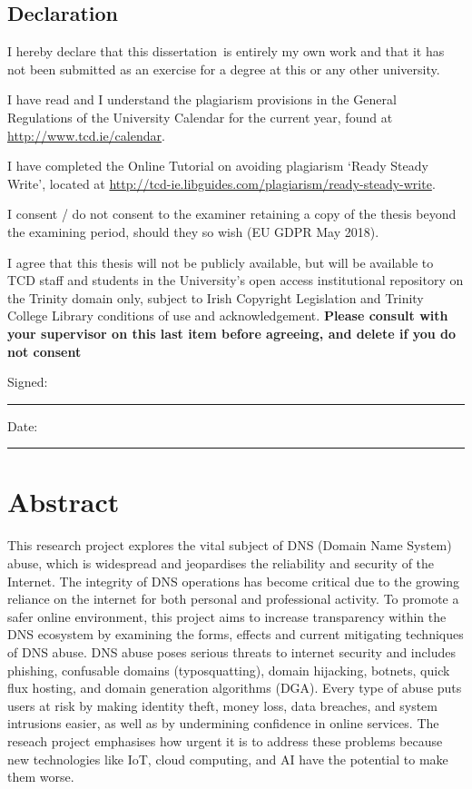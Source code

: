 \documentclass[a4paper,oneside,12pt]{book}
\title{\thesistitle}
\author{\authorname}
\newcommand{\typeofthesis}{dissertation} %
\numberwithin{equation}{chapter} %
\begin{document}

\section*{\Huge\textcolor{tcd_blue}{Declaration}}
\vspace{1cm}
I hereby declare that this \typeofthesis\ is entirely my own work and that it has not been submitted as an exercise for a degree at this or any other university.

\vspace{1cm}
I have read and I understand the plagiarism provisions in the General Regulations of the University Calendar for the current year, found at \url{http://www.tcd.ie/calendar}.
\vspace{1cm}

I have completed the Online Tutorial on avoiding plagiarism `Ready Steady Write', located at \url{http://tcd-ie.libguides.com/plagiarism/ready-steady-write}.
\vspace{1cm}

I consent / do not consent to the examiner retaining a copy of the thesis beyond the examining period, should they so wish (EU GDPR May 2018).
\vspace{1cm}

I agree that this thesis will not be publicly available, but will be available to TCD staff and students in the University’s open access institutional repository on the Trinity domain only, subject to Irish Copyright Legislation and Trinity College Library conditions of use and acknowledgement.  \textbf{Please consult with your supervisor on this last item before agreeing, and delete if you do not consent}
\vspace{3cm}

Signed:~\rule{5cm}{0.3pt}\hfill Date:~\rule{5cm}{0.3pt}

\chapter*{Abstract}

This research project explores the vital subject of DNS (Domain Name System) abuse, which is widespread and jeopardises the reliability and security of the Internet. The integrity of DNS operations has become critical due to the growing reliance on the internet for both personal and professional activity. To promote a safer online environment, this project aims to increase transparency within the DNS ecosystem by examining the forms, effects and current mitigating techniques of DNS abuse. DNS abuse poses serious threats to internet security and includes phishing, confusable domains (typosquatting), domain hijacking, botnets, quick flux hosting, and domain generation algorithms (DGA). Every type of abuse puts users at risk by making identity theft, money loss, data breaches, and system intrusions easier, as well as by undermining confidence in online services. The reseach project emphasises how urgent it is to address these problems because new technologies like IoT, cloud computing, and AI have the potential to make them worse.
\end{document}

